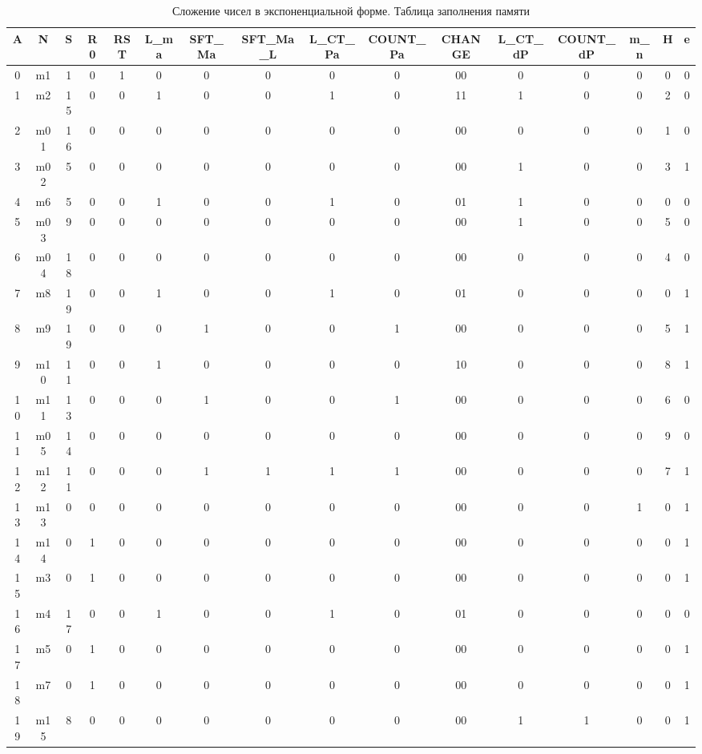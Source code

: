 \documentclass[a4paper,14pt]{extarticle}
\begin{document}
\newpage
\begin{landscape}

\begin{table}[htbp]
	\small
	\begin{tabular}{|c||c|c|c|c|c|c|c|c|c|c|c|c|c|c|c|}
		\hline
		\textbf{A} & \textbf{N} & \textbf{S} & \textbf{R0} & \textbf{RST} & \textbf{L\_ma} & \textbf{SFT\_Ma} & \textbf{SFT\_Ma\_L} & \textbf{L\_CT\_Pa} & \textbf{COUNT\_Pa} & \textbf{CHANGE} & \textbf{L\_CT\_dP} & \textbf{COUNT\_dP} & \textbf{m\_n} & \textbf{H} & \textbf{e} \\ \hline \hline
		0 & m1 & 1 & 0 & 1 & 0 & 0 & 0 & 0 & 0 & 00 & 0 & 0 & 0 & 0 & 0 \\ \hline
		1 & m2 & 15 & 0 & 0 & 1 & 0 & 0 & 1 & 0 & 11 & 1 & 0 & 0 & 2 & 0 \\ \hline
		2 & m01 & 16 & 0 & 0 & 0 & 0 & 0 & 0 & 0 & 00 & 0 & 0 & 0 & 1 & 0 \\ \hline
		3 & m02 & 5 & 0 & 0 & 0 & 0 & 0 & 0 & 0 & 00 & 1 & 0 & 0 & 3 & 1 \\ \hline
		4 & m6 & 5 & 0 & 0 & 1 & 0 & 0 & 1 & 0 & 01 & 1 & 0 & 0 & 0 & 0 \\ \hline
		5 & m03 & 9 & 0 & 0 & 0 & 0 & 0 & 0 & 0 & 00 & 1 & 0 & 0 & 5 & 0 \\ \hline
		6 & m04 & 18 & 0 & 0 & 0 & 0 & 0 & 0 & 0 & 00 & 0 & 0 & 0 & 4 & 0 \\ \hline
		7 & m8 & 19 & 0 & 0 & 1 & 0 & 0 & 1 & 0 & 01 & 0 & 0 & 0 & 0 & 1 \\ \hline
		8 & m9 & 19 & 0 & 0 & 0 & 1 & 0 & 0 & 1 & 00 & 0 & 0 & 0 & 5 & 1 \\ \hline
		9 & m10 & 11 & 0 & 0 & 1 & 0 & 0 & 0 & 0 & 10 & 0 & 0 & 0 & 8 & 1 \\ \hline
		10 & m11 & 13 & 0 & 0 & 0 & 1 & 0 & 0 & 1 & 00 & 0 & 0 & 0 & 6 & 0 \\ \hline
		11 & m05 & 14 & 0 & 0 & 0 & 0 & 0 & 0 & 0 & 00 & 0 & 0 & 0 & 9 & 0 \\ \hline
		12 & m12 & 11 & 0 & 0 & 0 & 1 & 1 & 1 & 1 & 00 & 0 & 0 & 0 & 7 & 1 \\ \hline
		13 & m13 & 0 & 0 & 0 & 0 & 0 & 0 & 0 & 0 & 00 & 0 & 0 & 1 & 0 & 1 \\ \hline
		14 & m14 & 0 & 1 & 0 & 0 & 0 & 0 & 0 & 0 & 00 & 0 & 0 & 0 & 0 & 1 \\ \hline
		15 & m3 & 0 & 1 & 0 & 0 & 0 & 0 & 0 & 0 & 00 & 0 & 0 & 0 & 0 & 1 \\ \hline
		16 & m4 & 17 & 0 & 0 & 1 & 0 & 0 & 1 & 0 & 01 & 0 & 0 & 0 & 0 & 0 \\ \hline
		17 & m5 & 0 & 1 & 0 & 0 & 0 & 0 & 0 & 0 & 00 & 0 & 0 & 0 & 0 & 1 \\ \hline
		18 & m7 & 0 & 1 & 0 & 0 & 0 & 0 & 0 & 0 & 00 & 0 & 0 & 0 & 0 & 1 \\ \hline
		19 & m15 & 8 & 0 & 0 & 0 & 0 & 0 & 0 & 0 & 00 & 1 & 1 & 0 & 0 & 1 \\ \hline
	\end{tabular}
	\caption{Сложение чисел в экспоненциальной форме. Таблица заполнения памяти}
	\label{tab:coursesummemory}
\end{table}
\end{landscape}
\end{document}
